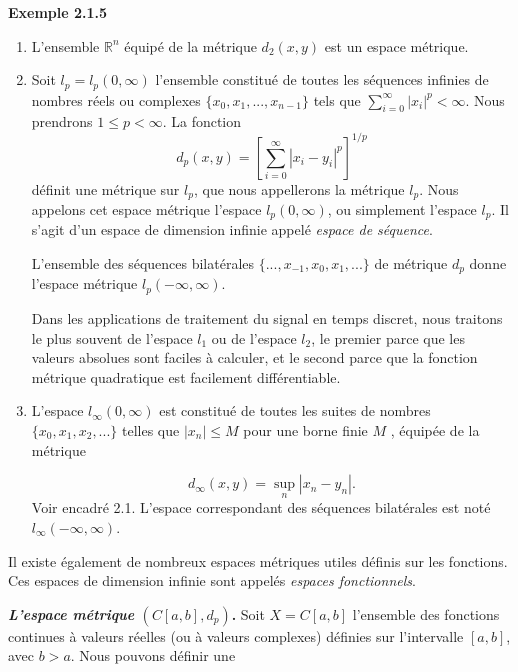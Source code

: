 \documentclass[11pt,twoside,a4paper]{article}
\begin{document}
\textbf{Exemple 2.1.5}
\begin{enumerate}
  \item L'ensemble $\mathbb{R}^n$ équipé de la métrique $d_2(x, y)$ est un espace métrique.
  \item Soit $l_p = l_p(0, \infty)$ l'ensemble constitué de toutes les séquences infinies de nombres réels ou complexes $\{x_0, x_1,...,x_{n-1}\}$ tels que
  $\sum_{i=0}^{\infty} |x_i|^p < \infty$. Nous prendrons $1 \leq p < \infty$. La fonction
  \begin{equation*}
    d_p(x, y) = \left[{\sum_{i=0}^{\infty} |x_i - y_i|^p}\right]^{1/p}
  \end{equation*}
  définit une métrique sur $l_p$, que nous appellerons la métrique $l_p$. Nous appelons cet espace métrique l'espace $l_p(0, \infty)$, ou simplement l'espace $l_p$. 
  Il s'agit d'un espace de dimension infinie appelé \textit{espace de séquence}.

  L'ensemble des séquences bilatérales $\{...,x_{-1}, x_0, x_1,...\}$ de métrique $d_p$ donne l'espace métrique $l_p(-\infty, \infty)$.

  Dans les applications de traitement du signal en temps discret, nous traitons le plus souvent de l'espace $l_1$ ou de l'espace $l_2$, le premier parce que les valeurs absolues sont faciles à calculer, et le second parce que la fonction métrique quadratique est facilement différentiable.

  \item L'espace $l_\infty(0, \infty)$ est constitué de toutes les suites de nombres $\{x_0, x_1, x_2,...\}$ telles que $|x_n| \leq M$ pour une borne finie $M$ , équipée de la métrique
  
  \begin{equation}
    d_\infty(x, y) = \sup\limits_n |x_n - y_n| .
  \end{equation}
  Voir encadré 2.1. L'espace correspondant des séquences bilatérales est noté $l_\infty(-\infty, \infty)$.
\end{enumerate}

Il existe également de nombreux espaces métriques utiles définis sur les fonctions. Ces espaces de dimension infinie sont appelés \textit{espaces fonctionnels}.

\textbf{\textit{L'espace métrique} $(C[a, b], d_p)$.} Soit $X = C[a, b]$ l'ensemble des fonctions continues à valeurs réelles (ou à valeurs complexes) définies sur l'intervalle $[a, b]$, avec $b > a$. Nous pouvons définir une

\vspace{7mm}
\end{document}
